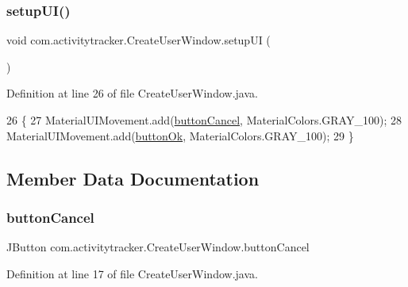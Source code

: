 \subsubsection{\texorpdfstring{setup\+U\+I()}{setupUI()}}
{\footnotesize\ttfamily void com.\+activitytracker.\+Create\+User\+Window.\+setup\+UI (\begin{DoxyParamCaption}{ }\end{DoxyParamCaption})\hspace{0.3cm}{\ttfamily [private]}}



Definition at line 26 of file Create\+User\+Window.\+java.


\begin{DoxyCode}
26                            \{
27         MaterialUIMovement.add(\mbox{\hyperlink{classcom_1_1activitytracker_1_1_create_user_window_a975a5cc35d145a3efa4d9e340776ca63}{buttonCancel}}, MaterialColors.GRAY\_100);
28         MaterialUIMovement.add(\mbox{\hyperlink{classcom_1_1activitytracker_1_1_create_user_window_aa22864c8baa65b46fe9a7621748d7841}{buttonOk}}, MaterialColors.GRAY\_100);
29     \}
\end{DoxyCode}


\subsection{Member Data Documentation}
\mbox{\label{classcom_1_1activitytracker_1_1_create_user_window_a975a5cc35d145a3efa4d9e340776ca63}} 
\subsubsection{\texorpdfstring{button\+Cancel}{buttonCancel}}
{\footnotesize\ttfamily J\+Button com.\+activitytracker.\+Create\+User\+Window.\+button\+Cancel\hspace{0.3cm}{\ttfamily [private]}}



Definition at line 17 of file Create\+User\+Window.\+java.

\mbox{\label{classcom_1_1activitytracker_1_1_create_user_window_aa22864c8baa65b46fe9a7621748d7841}} 
